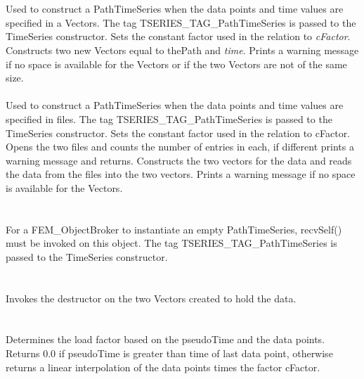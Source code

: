  \\ 
\\ 
Used to construct a PathTimeSeries when the data points and time
values are specified in a Vectors. The tag
TSERIES\_TAG\_PathTimeSeries is passed to the TimeSeries 
constructor. Sets the constant factor used in the relation to {\em
cFactor}. Constructs two new Vectors equal to \p thePath and {\em
time}. Prints a warning message if no space is available for the
Vectors or if the two Vectors are not of the same size.\\ 

\\  
Used to construct a PathTimeSeries when the data points and time
values are specified in files. The tag TSERIES\_TAG\_PathTimeSeries is
passed to the TimeSeries constructor. Sets the constant factor used in
the relation to \p cFactor. Opens the two files and counts the
number of entries in each, if different prints a warning message and
returns. Constructs the two vectors for the data and reads the data
from the files into the two vectors. Prints a warning message if no
space is available for the Vectors.\\

\\ \\
For a FEM\_ObjectBroker to instantiate an empty PathTimeSeries, recvSelf()
must be invoked on this object. The tag TSERIES\_TAG\_PathTimeSeries is
passed to the TimeSeries constructor. \\


 \\
\\ 
Invokes the destructor on the two Vectors created to hold the data. \\

 \\
\\
Determines the load factor based on the \p pseudoTime and the data
points. Returns $0.0$ if \p pseudoTime is greater than time of last
data point, otherwise returns a linear interpolation of the data
points times the factor \p cFactor. \\

